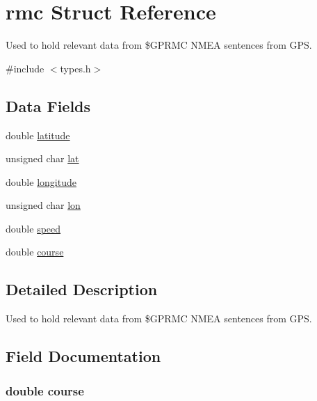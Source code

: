 \hypertarget{structrmc}{}\section{rmc Struct Reference}
\label{structrmc}


Used to hold relevant data from \$\+G\+P\+R\+MC N\+M\+EA sentences from G\+PS.  




{\ttfamily \#include $<$types.\+h$>$}

\subsection*{Data Fields}
\begin{DoxyCompactItemize}
\item 
double \hyperlink{structrmc_a76714bdbc5c536fa77dfb14533ff82a9}{latitude}
\item 
unsigned char \hyperlink{structrmc_a6a2e4ad53afd61fcd716002fc2965220}{lat}
\item 
double \hyperlink{structrmc_ac155e35fdeebafc89723a51520fb9fe6}{longitude}
\item 
unsigned char \hyperlink{structrmc_a7e55b80071251dcef4239e60122980a4}{lon}
\item 
double \hyperlink{structrmc_a6dc6e6f3c75c509ce943163afb5dade7}{speed}
\item 
double \hyperlink{structrmc_acaa2fde7e3fad7df8f5755347603d17b}{course}
\end{DoxyCompactItemize}


\subsection{Detailed Description}
Used to hold relevant data from \$\+G\+P\+R\+MC N\+M\+EA sentences from G\+PS. 

\subsection{Field Documentation}
\subsubsection[{\texorpdfstring{course}{course}}]{\setlength{\rightskip}{0pt plus 5cm}double course}\hypertarget{structrmc_acaa2fde7e3fad7df8f5755347603d17b}{}\label{structrmc_acaa2fde7e3fad7df8f5755347603d17b}
